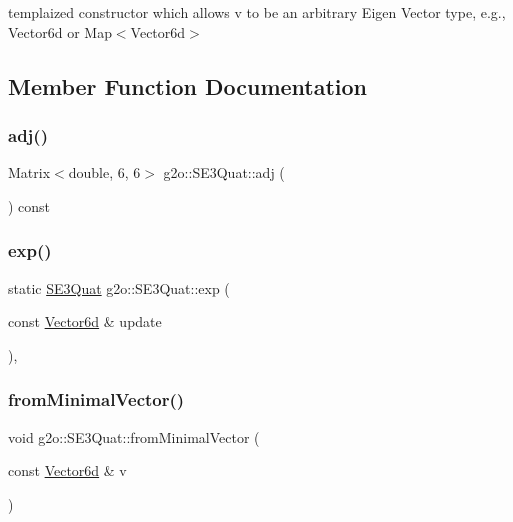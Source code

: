 templaized constructor which allows v to be an arbitrary Eigen Vector type, e.\+g., Vector6d or Map$<$\+Vector6d$>$ 

\subsection{Member Function Documentation}
\mbox{\label{classg2o_1_1_s_e3_quat_a5540394ac7f1a61c5e04ceed9c96617a}} 
\subsubsection{\texorpdfstring{adj()}{adj()}}
{\footnotesize\ttfamily Matrix$<$double, 6, 6$>$ g2o\+::\+S\+E3\+Quat\+::adj (\begin{DoxyParamCaption}{ }\end{DoxyParamCaption}) const\hspace{0.3cm}{\ttfamily [inline]}}

\mbox{\label{classg2o_1_1_s_e3_quat_a374a05b202889d09d5a3a25e0fb6c103}} 
\subsubsection{\texorpdfstring{exp()}{exp()}}
{\footnotesize\ttfamily static \mbox{\hyperlink{classg2o_1_1_s_e3_quat}{S\+E3\+Quat}} g2o\+::\+S\+E3\+Quat\+::exp (\begin{DoxyParamCaption}\item[{const \mbox{\hyperlink{namespaceg2o_a3bc8a4fbac86f158d548be81af2f929b}{Vector6d}} \&}]{update }\end{DoxyParamCaption})\hspace{0.3cm}{\ttfamily [inline]}, {\ttfamily [static]}}

\mbox{\label{classg2o_1_1_s_e3_quat_a65714851482e99558401d4ea66edb183}} 
\subsubsection{\texorpdfstring{from\+Minimal\+Vector()}{fromMinimalVector()}}
{\footnotesize\ttfamily void g2o\+::\+S\+E3\+Quat\+::from\+Minimal\+Vector (\begin{DoxyParamCaption}\item[{const \mbox{\hyperlink{namespaceg2o_a3bc8a4fbac86f158d548be81af2f929b}{Vector6d}} \&}]{v }\end{DoxyParamCaption})\hspace{0.3cm}{\ttfamily [inline]}}

